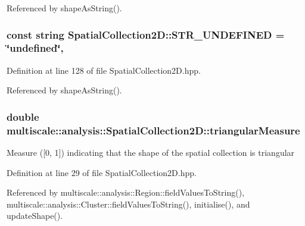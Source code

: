 Referenced by shape\-As\-String().

\hypertarget{classmultiscale_1_1analysis_1_1SpatialCollection2D_afce51890a0eebb60c5622a39485c2d2a}{
\subsubsection[{S\-T\-R\-\_\-\-U\-N\-D\-E\-F\-I\-N\-E\-D}]{\setlength{\rightskip}{0pt plus 5cm}const string Spatial\-Collection2\-D\-::\-S\-T\-R\-\_\-\-U\-N\-D\-E\-F\-I\-N\-E\-D = \char`\"{}undefined\char`\"{}\hspace{0.3cm}{\ttfamily [static]}, {\ttfamily [protected]}}}\label{classmultiscale_1_1analysis_1_1SpatialCollection2D_afce51890a0eebb60c5622a39485c2d2a}


Definition at line 128 of file Spatial\-Collection2\-D.\-hpp.



Referenced by shape\-As\-String().

\hypertarget{classmultiscale_1_1analysis_1_1SpatialCollection2D_a578070e91858e9e87de1e0f5771d6c3f}{
\subsubsection[{triangular\-Measure}]{\setlength{\rightskip}{0pt plus 5cm}double multiscale\-::analysis\-::\-Spatial\-Collection2\-D\-::triangular\-Measure\hspace{0.3cm}{\ttfamily [protected]}}}\label{classmultiscale_1_1analysis_1_1SpatialCollection2D_a578070e91858e9e87de1e0f5771d6c3f}
Measure (\mbox{[}0, 1\mbox{]}) indicating that the shape of the spatial collection is triangular 

Definition at line 29 of file Spatial\-Collection2\-D.\-hpp.



Referenced by multiscale\-::analysis\-::\-Region\-::field\-Values\-To\-String(), multiscale\-::analysis\-::\-Cluster\-::field\-Values\-To\-String(), initialise(), and update\-Shape().


